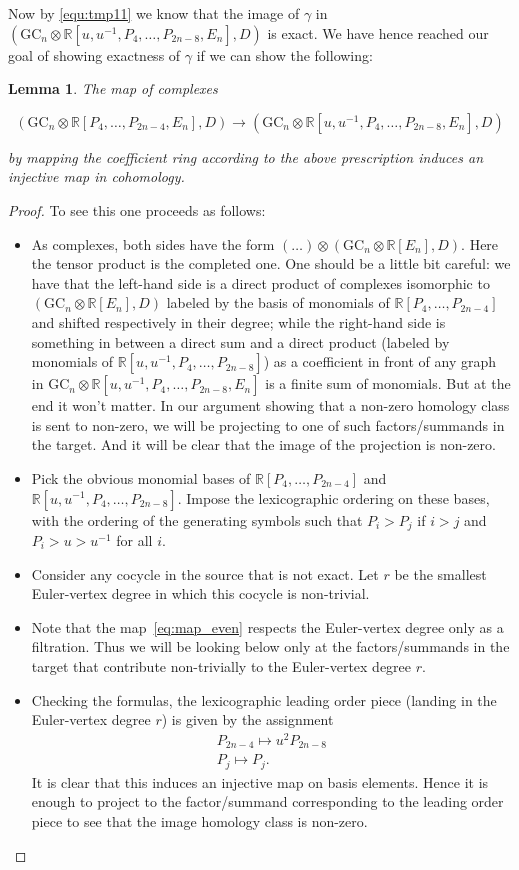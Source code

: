 \documentclass[a4paper]{amsart}
\theoremstyle{plain}
\newtheorem{lemma}[thm]{Lemma}
\theoremstyle{definition}
\newcommand{\R}{{\mathbb{R}}}
\newcommand{\GC}{\mathrm{GC}}
\newcommand{\beq}[1]{
\begin{equation}\label{#1}
}
\newcommand{\eeq}{
\end{equation}
}
\begin{document}
Now by \eqref{equ:tmp11} we know that the image of $\gamma$ in  $(\GC_n \otimes \R[u,u^{-1}, P_4,\dots,P_{2n-8},E_n], D)$ is exact. We have hence reached our goal of showing exactness of $\gamma$ if we can show the following:
\begin{lemma}
The map of complexes
\beq{eq:map_even}
(\GC_n \otimes \R[P_4,\dots,P_{2n-4},E_n], D)
\to 
(\GC_n \otimes \R[u,u^{-1}, P_4,\dots,P_{2n-8},E_n], D)
\eeq
by mapping the coefficient ring according to the above prescription induces an injective map in cohomology.
\end{lemma}
\begin{proof}
To see this one proceeds as follows:
\begin{itemize}
\item As complexes, both sides have the form $(\dots)\otimes (\GC_n\otimes \R[E_n],D)$. Here 
the tensor product is the completed one. One should be a little bit careful: we have that the left-hand side
is a direct product of complexes isomorphic to $ (\GC_n\otimes \R[E_n],D)$ labeled by the basis of monomials of 
$\R[P_4,\dots,P_{2n-4}]$ and shifted respectively in their degree; while the right-hand side is something in between a direct sum and a direct product (labeled by monomials of $\R[u,u^{-1}, P_4,\dots,P_{2n-8}]$) as
a coefficient in front of any graph in $\GC_n \otimes \R[u,u^{-1}, P_4,\dots,P_{2n-8},E_n]$ is a finite sum
of monomials. But at the end it won\rq{}t matter. In our argument showing that a non-zero homology class
is sent to non-zero, we will be projecting to one of such factors/summands in the target. And it will be clear that the image of the projection is non-zero.
\item Pick the obvious monomial bases of $\R[P_4,\dots,P_{2n-4}]$ and $ \R[u,u^{-1}, P_4,\dots,P_{2n-8}]$. Impose the lexicographic ordering on these bases, with the ordering of the generating symbols such that  $P_i>P_j$ if $i>j$ and $P_i>u>u^{-1}$ for all $i$.
\item Consider any cocycle in the source that is not exact. Let $r$ be the smallest Euler-vertex degree in which this cocycle is non-trivial.
\item  Note that the map~\eqref{eq:map_even} respects the Euler-vertex degree only as a filtration.
Thus we will be looking below only at the factors/summands in the target that contribute non-trivially to
the Euler-vertex degree $r$.
\item Checking the formulas, the lexicographic leading order piece (landing in the Euler-vertex degree $r$) is given by the assignment 
\begin{align*}
P_{2n-4}\mapsto u^2 P_{2n-8} \\
P_j\mapsto P_j .
\end{align*}
It is clear that this induces an injective map on basis elements. Hence it is enough to project to the factor/summand corresponding to the leading order piece to see that the image homology class is non-zero.
\end{itemize}
\end{proof}
\end{document}
